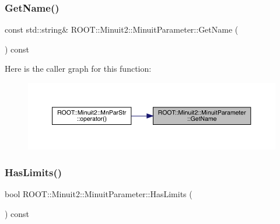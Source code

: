 \mbox{\label{classROOT_1_1Minuit2_1_1MinuitParameter_adc67abcb32783aed362068ee38cb24b7}} 
\subsubsection{\texorpdfstring{GetName()}{GetName()}\hspace{0.1cm}{\footnotesize\ttfamily [2/2]}}
{\footnotesize\ttfamily const std\+::string\& R\+O\+O\+T\+::\+Minuit2\+::\+Minuit\+Parameter\+::\+Get\+Name (\begin{DoxyParamCaption}{ }\end{DoxyParamCaption}) const\hspace{0.3cm}{\ttfamily [inline]}}

Here is the caller graph for this function\+:\nopagebreak
\begin{figure}[H]
\begin{center}
\leavevmode
\includegraphics[width=350pt]{dd/dfb/classROOT_1_1Minuit2_1_1MinuitParameter_adc67abcb32783aed362068ee38cb24b7_icgraph}
\end{center}
\end{figure}
\mbox{\label{classROOT_1_1Minuit2_1_1MinuitParameter_a6319fe000027da162c4adad8782ef27b}} 
\subsubsection{\texorpdfstring{HasLimits()}{HasLimits()}\hspace{0.1cm}{\footnotesize\ttfamily [1/2]}}
{\footnotesize\ttfamily bool R\+O\+O\+T\+::\+Minuit2\+::\+Minuit\+Parameter\+::\+Has\+Limits (\begin{DoxyParamCaption}{ }\end{DoxyParamCaption}) const\hspace{0.3cm}{\ttfamily [inline]}}

